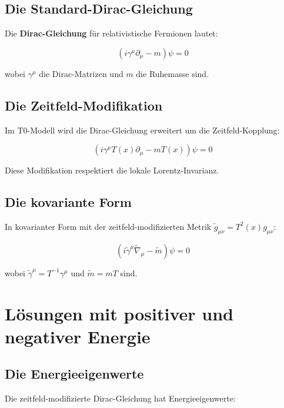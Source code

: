 \documentclass[12pt,a4paper]{report}
\begin{document}
\subsection{Die Standard-Dirac-Gleichung}

Die \textbf{Dirac-Gleichung} für relativistische Fermionen lautet:

\begin{equation}
	(i\gamma^\mu\partial_\mu - m)\psi = 0
\end{equation}

wobei $\gamma^\mu$ die Dirac-Matrizen und $m$ die Ruhemasse sind.

\subsection{Die Zeitfeld-Modifikation}

Im T0-Modell wird die Dirac-Gleichung erweitert um die Zeitfeld-Kopplung:

\begin{equation}
	\left(i\gamma^\mu T(x)\partial_\mu - m T(x)\right)\psi = 0
\end{equation}

Diese Modifikation respektiert die lokale Lorentz-Invarianz.

\subsection{Die kovariante Form}

In kovarianter Form mit der zeitfeld-modifizierten Metrik $\tilde{g}_{\mu\nu} = T^2(x) g_{\mu\nu}$:

\begin{equation}
	\left(i\tilde{\gamma}^\mu\tilde{\nabla}_\mu - \tilde{m}\right)\psi = 0
\end{equation}

wobei $\tilde{\gamma}^\mu = T^{-1}\gamma^\mu$ und $\tilde{m} = mT$ sind.

\section{Lösungen mit positiver und negativer Energie}

\subsection{Die Energieeigenwerte}

Die zeitfeld-modifizierte Dirac-Gleichung hat Energieeigenwerte:
\end{document}
